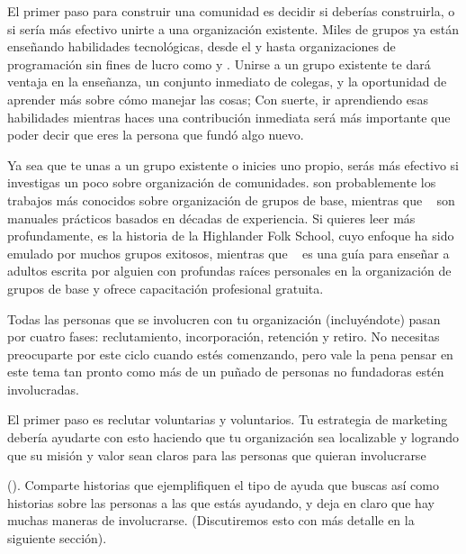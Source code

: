 El primer paso para construir una comunidad es decidir si deberías construirla,
o si sería más efectivo unirte a una organización existente.
Miles de grupos ya están enseñando habilidades tecnológicas,
desde el 
y 
hasta organizaciones de programación sin fines de lucro como
y .
Unirse a un grupo existente te dará ventaja en la enseñanza,
un conjunto inmediato de colegas,
y la oportunidad de aprender más sobre cómo manejar las cosas;
Con suerte,
ir aprendiendo esas habilidades mientras haces una contribución inmediata
será más importante que poder decir que
eres la persona que fundó algo nuevo.

Ya sea que te unas a un grupo existente o inicies uno propio,
serás más efectivo si  investigas un poco sobre organización de comunidades.
\cite{Alin1989,Lake2018} son probablemente los trabajos más conocidos sobre organización de grupos de base,
mientras que ~\cite{Brow2007,Midw2010,Lake2018} son manuales prácticos basados en décadas de experiencia.
Si quieres leer más profundamente,
\cite{Adam1975} es la historia de la Highlander Folk School,
cuyo enfoque ha sido emulado por muchos grupos exitosos,
mientras que ~\cite{Spal2014} es una guía para enseñar a adultos
escrita por alguien con profundas raíces personales en la organización de grupos de base
y 
ofrece capacitación profesional gratuita.


Todas las personas que se involucren con tu organización
(incluyéndote)
pasan por cuatro fases:
reclutamiento, incorporación, retención y retiro.
No necesitas preocuparte por este ciclo cuando estés comenzando,
pero vale la pena pensar en este tema
tan pronto como más de un puñado de personas no fundadoras estén involucradas.

El primer paso es reclutar voluntarias y voluntarios.
Tu estrategia de marketing debería ayudarte con esto haciendo que tu organización sea localizable
y logrando que su  misión y valor sean claros
para las personas que quieran involucrarse

().
Comparte historias que ejemplifiquen el tipo de ayuda que buscas 
así como historias sobre las personas a las que estás ayudando,
y deja en claro que hay muchas maneras de involucrarse.
(Discutiremos esto con más detalle en la siguiente sección).

